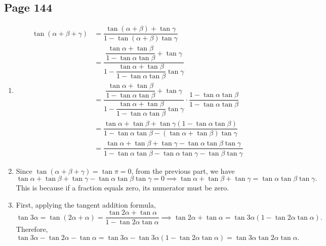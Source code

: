 \documentclass{article}
\newenvironment{solutions}[1]
{\subsection*{#1}
 \begin{enumerate}[leftmargin=1.5em]}
{\end{enumerate}}
\newcommand{\solution}{\item}
\begin{document}
\begin{solutions}{Page 144}
Alternatively, since $\tan\left(\alpha+\beta\right) = \tan \pi/4 = 1$,
\begin{align*}
\left(1+\tan{\alpha}\right)\left(1+\tan{\beta}\right) &= 1 + \tan{\alpha} + \tan{\beta} + \tan{\alpha}\tan{\beta} \\
&= 1 + \left(\tan{\alpha} + \tan{\beta}\right)\left(\dfrac{1-\tan{\alpha}\tan{\beta}}{1-\tan{\alpha}\tan{\beta}}\right) + \tan{\alpha}\tan{\beta} \\
&= 1 + \left(1-\tan{\alpha}\tan{\beta}\right)\left(\dfrac{\tan{\alpha} + \tan{\beta}}{1-\tan{\alpha}\tan{\beta}}\right) + \tan{\alpha}\tan{\beta} \\
&= 1 + \left(1-\tan{\alpha}\tan{\beta}\right)\tan\left(\alpha+\beta\right) + \tan{\alpha}\tan{\beta} \\
&= 1+ 1-\tan{\alpha}\tan{\beta} + \tan{\alpha}\tan{\beta} \\
&= 2
\end{align*}

\solution %
\begin{align*}
\tan\left(\alpha+\beta+\gamma\right) &= \dfrac{\tan\left(\alpha+\beta\right) + \tan{\gamma}}{1-\tan\left(\alpha+\beta\right)\tan{\gamma}} \\
&= \dfrac{\dfrac{\tan{\alpha} + \tan{\beta}}{1-\tan{\alpha}\tan{\beta}} + \tan\gamma}{1-\dfrac{\tan{\alpha} + \tan{\beta}}{1-\tan{\alpha}\tan{\beta}}\tan\gamma} \\
&= \dfrac{\dfrac{\tan{\alpha} + \tan{\beta}}{1-\tan{\alpha}\tan{\beta}} + \tan\gamma}{1-\dfrac{\tan{\alpha} + \tan{\beta}}{1-\tan{\alpha}\tan{\beta}}\tan\gamma} \cdot \dfrac{1-\tan{\alpha}\tan{\beta}}{1-\tan{\alpha}\tan{\beta}} \\
&= \dfrac{\tan{\alpha}+\tan{\beta}+\tan{\gamma}\left(1-\tan{\alpha}\tan{\beta}\right)}{1 - \tan{\alpha}\tan{\beta} - \left(\tan{\alpha} + \tan{\beta}\right)\tan{\gamma}} \\
&= \dfrac{\tan{\alpha}+\tan{\beta}+\tan{\gamma} -\tan{\alpha}\tan{\beta}\tan{\gamma}}{1 - \tan{\alpha}\tan{\beta} - \tan{\alpha}\tan{\gamma} - \tan{\beta}\tan{\gamma}}
\end{align*}

\solution %
Since $\tan\left(\alpha+\beta+\gamma\right) = \tan{\pi} = 0$, from the previous part, we have
\[
\tan{\alpha}+\tan{\beta}+\tan{\gamma} -\tan{\alpha}\tan{\beta}\tan{\gamma} = 0 \implies \tan{\alpha}+\tan{\beta}+\tan{\gamma} = \tan{\alpha}\tan{\beta}\tan{\gamma}.
\]
This is because if a fraction equals zero, its numerator must be zero.

\solution %
First, applying the tangent addition formula,
\[
\tan{3\alpha} = \tan\left(2\alpha+\alpha\right) = \dfrac{\tan{2\alpha} + \tan{\alpha}}{1-\tan{2\alpha}\tan{\alpha}} \implies \tan{2\alpha} + \tan{\alpha} = \tan{3\alpha}\left(1-\tan{2\alpha}\tan{\alpha}\right).
\]
Therefore,
\[
\tan{3\alpha} - \tan{2\alpha} - \tan{\alpha} = \tan{3\alpha} - \tan{3\alpha}\left(1-\tan{2\alpha}\tan{\alpha}\right) = \tan{3\alpha}\tan{2\alpha}\tan{\alpha}.
\]


\end{solutions}
\end{document}
